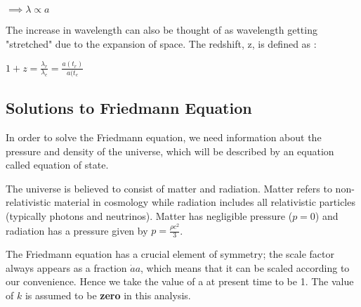 \documentclass{article}
\begin{document}
\begin{center}
    $\implies{\lambda \propto a}$
\end{center}

The increase in wavelength can also be thought of as wavelength getting "stretched" due to the expansion of space. The redshift, z, is defined as :

\begin{center}
    $1+z = \frac{\lambda_{r}}{\lambda_{e}} = \frac{a(t_r)}{a(t_e}$
\end{center}

\subsection{Solutions to Friedmann Equation}
In order to solve the Friedmann equation, we need information about the pressure and density of the universe, which will be described by an equation called equation of state. 

The universe is believed to consist of matter and radiation. Matter refers to non-relativistic material in cosmology while radiation includes all relativistic particles (typically photons and neutrinos). Matter has negligible pressure ($p = 0$) and radiation has a pressure given by $p = \frac{{\rho}c^2}{3}$.

The Friedmann equation has a crucial element of symmetry; the scale factor always appears as a fraction ${\dot{a}}{a}$, which means that it can be scaled according to our convenience. Hence we take the value of a at present time to be 1. The value of $k$ is assumed to be \textbf{zero} in this analysis. 
\end{document}
